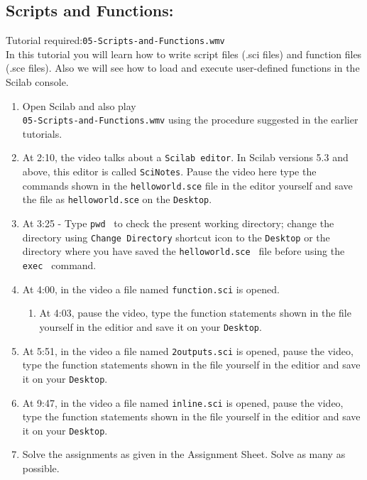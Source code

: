 \documentclass[11pt]{article}
\newenvironment{enumcpt}{\begin{enumerate} \topsep 0pt \partopsep 0pt 
                        \parsep 0pt
                        \itemsep 0pt \leftmargin -1in \rightmargin 0pt
                        }{\end{enumerate}}
\begin{document}
\begin{multicols}{2}
\section{Scripts and Functions:}
Tutorial required:{\tt 05-Scripts-and-Functions.wmv }
\\ In this tutorial you will learn how to write script files (.sci files) and function files (.sce files). Also we will see how to load and execute user-defined functions in the Scilab console.
\begin{enumcpt}
\item Open Scilab and also play \\
{\tt 05-Scripts-and-Functions.wmv} using the procedure suggested in the
earlier tutorials.
\item At 2:10, the video talks about a {\tt Scilab editor}.  In Scilab
  versions 5.3 and above, this editor is called {\tt SciNotes}. %
  Pause the video here type the commands shown in the {\tt helloworld.sce} file in the editor yourself and save the file as {\tt helloworld.sce} on the {\tt Desktop}.  
\item At 3:25 - Type {\tt pwd } to check the present working directory; change the directory using {\tt Change Directory} shortcut icon to the {\tt Desktop} or the directory where you have saved the {\tt helloworld.sce } file before using the {\tt exec } command.
\item At 4:00, in the video a file named {\tt function.sci} is opened. 
	\begin{enumcpt}
	\item At 4:03, pause the video, type the function statements shown in 			the file yourself in the editior and save it on your {\tt Desktop}.
	\end{enumcpt}
\item At 5:51, in the video a file named {\tt 2outputs.sci} is opened, pause the video, type the function statements shown in the file yourself in the editior and save it on your {\tt Desktop}.
\item At 9:47, in the video a file named {\tt inline.sci} is opened, pause the video, type the function statements shown in the file yourself in the editior and save it on your {\tt Desktop}.
\item Solve the assignments as given in the Assignment Sheet. Solve as many as possible.
\end{enumcpt}


\end{multicols}
\end{document}
